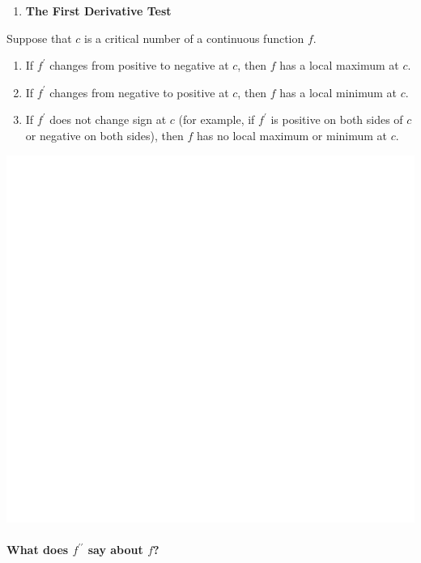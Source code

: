 \documentclass[]{book}
\providecommand{\tightlist}{%
  \setlength{\itemsep}{0pt}\setlength{\parskip}{0pt}}
\let\oldparagraph\paragraph
\renewcommand{\paragraph}[1]{\oldparagraph{#1}\mbox{}}
\begin{document}
\newpage

\begin{enumerate}
\def\labelenumi{\arabic{enumi}.}
\setcounter{enumi}{1}
\tightlist
\item
  \textbf{The First Derivative Test}
\end{enumerate}

Suppose that \(c\) is a critical number of a continuous function \(f\).

\begin{enumerate}
\def\labelenumi{(\alph{enumi})}
\item
  If \(f^\prime\) changes from positive to negative at \(c\), then \(f\) has a local maximum at \(c\).
\item
  If \(f^\prime\) changes from negative to positive at \(c\), then \(f\) has a local minimum at \(c\).
\item
  If \(f^\prime\) does not change sign at \(c\) (for example, if \(f^\prime\) is positive on both sides of \(c\) or negative on both sides), then \(f\) has no local maximum or minimum at \(c\).
\end{enumerate}

\begin{center}\includegraphics[width=1\linewidth]{figure/LB36-1} \end{center}

\hypertarget{what-does-fprime-prime-say-about-f}{%
\paragraph{\texorpdfstring{What does \(f^{\prime \prime}\) say about \(f\)?}{What does f\^{}\{\textbackslash{}prime \textbackslash{}prime\} say about f?}}\label{what-does-fprime-prime-say-about-f}}
\end{document}
